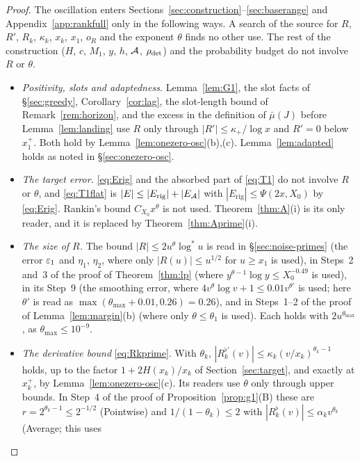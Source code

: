 \begin{proof}
The oscillation enters Sections~\ref{sec:construction}--\ref{sec:baserange} and Appendix~\ref{app:rankfull} only in the following ways. A
search of the source for $R$, $R'$, $R_k$, $\kappa_k$, $x_k$, $x_1$, $o_R$ and the exponent $\theta$ finds no other use. The rest of the
construction ($H$, $c$, $M_1$, $y$, $h$, $\mathcal{A}$, $\rho_{\mathrm{det}}$) and the probability budget do not involve $R$ or $\theta$.
\begin{itemize}
\item \emph{Positivity, slots and adaptedness.} Lemma~\ref{lem:G1}, the slot facts of \S\ref{sec:greedy}, Corollary~\ref{cor:lag}, the
slot-length bound of Remark~\ref{rem:horizon}, and the excess in the definition of $\bar\mu(J)$ before Lemma~\ref{lem:landing} use
$R$ only through $|R'|\le\kappa_+/\log x$ and $R'=0$ below $x_1^+$. Both hold by Lemma~\ref{lem:onezero-osc}(b),(c).
Lemma~\ref{lem:adapted} holds as noted in \S\ref{sec:onezero-osc}.
\item \emph{The target error.} \eqref{eq:Erig} and the absorbed part of \eqref{eq:T1} do not involve $R$ or $\theta$, and
\eqref{eq:T1flat} is $|E|\le|E_{\mathrm{rig}}|+|E_{\mathcal{A}}|$ with $|E_{\mathrm{rig}}|\le\Psi(2x,X_0)$ by \eqref{eq:Erig}. Rankin's bound
$C_{X_0}x^\theta$ is not used. Theorem~\ref{thm:A}(i) is its only reader, and it is replaced by Theorem~\ref{thm:Aprime}(i).
\item \emph{The size of $R$.} The bound $|R|\le2u^\theta\log^*u$ is read in \S\ref{sec:noise-primes} (the error $\varepsilon_1$ and $\eta_1$,
$\eta_2$, where only $|R(u)|\le u^{1/2}$ for $u\ge x_1$ is used), in Steps~2 and~3 of the proof of Theorem~\ref{thm:lp} (where
$y^{\theta-1}\log y\le X_0^{-0.49}$ is used), in its Step~9 (the smoothing error, where $4v^\theta\log v+1\le0.01v^{\theta'}$ is used;
here $\theta'$ is read as $\max(\theta_{\max}+0.01,0.26)=0.26$), and in Steps~1--2 of the proof of Lemma~\ref{lem:margin}(b) (where
only $\theta\le\theta_1$ is used). Each holds with $2u^{\theta_{\max}}$, as $\theta_{\max}\le10^{-9}$.
\item \emph{The derivative bound} \eqref{eq:Rkprime}. With $\theta_k$, $|R_k^{\flat\prime}(v)|\le\kappa_k(v/x_k)^{\theta_k-1}$ holds, up to the
factor $1+2H(x_k)/x_k$ of Section~\ref{sec:target}, and exactly at $x_k^+$, by Lemma~\ref{lem:onezero-osc}(c). Its readers use
$\theta$ only through upper bounds. In Step~4 of the proof of Proposition~\ref{prop:g1}(B) these are
$r=2^{\theta_k-1}\le2^{-1/2}$ (Pointwise) and $1/(1-\theta_k)\le2$ with $|R_k^\flat(v)|\le\alpha_kv^{\theta_k}$ (Average; this uses

\end{itemize}
\end{proof}
